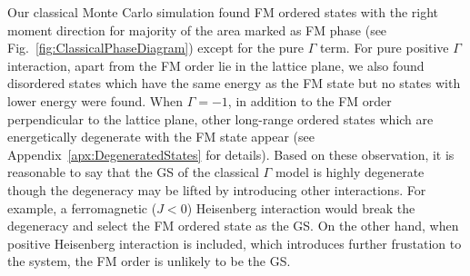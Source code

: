 \documentclass[aps,prb,reprint,amsfonts,amsmath,amssymb,showpacs,groupedaddress,superscriptaddress]{revtex4-1}
\begin{document}
Our classical Monte Carlo simulation found FM ordered states with the right moment direction for majority of the area marked as FM phase (see Fig.~\ref{fig:ClassicalPhaseDiagram}) except for the pure $\Gamma$ term. For pure positive $\Gamma$ interaction, apart from the FM order lie in the lattice plane, we also found disordered states which have the same energy as the FM state but no states with lower energy were found. When $\Gamma=-1$, in addition to the FM order perpendicular to the lattice plane, other long-range ordered states which are energetically degenerate with the FM state appear (see Appendix~\ref{apx:DegeneratedStates} for details). Based on these observation, it is reasonable to say that the GS of the classical $\Gamma$ model is highly degenerate though the degeneracy may be lifted by introducing other interactions. For example, a ferromagnetic ($J<0$) Heisenberg interaction would break the degeneracy and select the FM ordered state as the GS. On the other hand, when positive Heisenberg interaction is included, which introduces further frustation to the system, the FM order is unlikely to be the GS.
\end{document}
